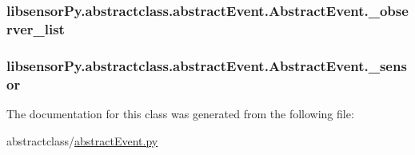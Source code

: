\subsubsection[{\+\_\+observer\+\_\+list}]{\setlength{\rightskip}{0pt plus 5cm}libsensor\+Py.\+abstractclass.\+abstract\+Event.\+Abstract\+Event.\+\_\+observer\+\_\+list\hspace{0.3cm}{\ttfamily [private]}}\label{classlibsensorPy_1_1abstractclass_1_1abstractEvent_1_1AbstractEvent_a40c8e2a2c62b981db72b14c40b203e0e}
\hypertarget{classlibsensorPy_1_1abstractclass_1_1abstractEvent_1_1AbstractEvent_ad24952f48deebd43f7d0f181e09c48c8}{}
\subsubsection[{\+\_\+sensor}]{\setlength{\rightskip}{0pt plus 5cm}libsensor\+Py.\+abstractclass.\+abstract\+Event.\+Abstract\+Event.\+\_\+sensor\hspace{0.3cm}{\ttfamily [private]}}\label{classlibsensorPy_1_1abstractclass_1_1abstractEvent_1_1AbstractEvent_ad24952f48deebd43f7d0f181e09c48c8}


The documentation for this class was generated from the following file\+:\begin{DoxyCompactItemize}
\item 
abstractclass/\hyperlink{abstractEvent_8py}{abstract\+Event.\+py}\end{DoxyCompactItemize}
